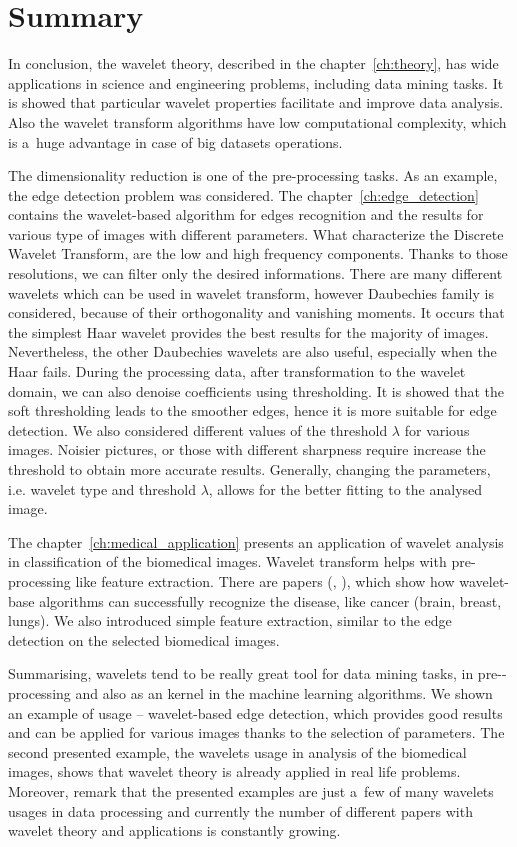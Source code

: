 \chapter*{Summary}

In conclusion, the wavelet theory, described in the chapter~\ref{ch:theory}, has wide applications in science and engineering problems, including data mining tasks. It is showed that particular wavelet properties facilitate and improve data analysis. Also the wavelet transform algorithms have low computational complexity, which is a~huge advantage in case of big datasets operations.

The dimensionality reduction is one of the pre-processing tasks. As an example, the edge detection problem was considered. The chapter~\ref{ch:edge_detection} contains the wavelet-based algorithm for edges recognition and the results for various type of images with different parameters. 
What characterize the Discrete Wavelet Transform, are the low and high frequency components. Thanks to those resolutions, we can filter only the desired informations. There are many different wavelets which can be used in wavelet transform, however Daubechies family is considered, because of their orthogonality and vanishing moments. It occurs that the simplest Haar wavelet provides the best results for the majority of images. Nevertheless, the other Daubechies wavelets are also useful, especially when the Haar fails. During the processing data, after transformation to the wavelet domain, we can also denoise coefficients using thresholding. It is showed that the soft thresholding leads to the smoother edges, hence it is more suitable for edge detection. We also considered different values of the threshold $\lambda$ for various images. Noisier pictures, or those with different sharpness require increase the threshold to obtain more accurate results.
Generally, changing the parameters, i.e. wavelet type and threshold $\lambda$, allows for the better fitting to the analysed image.

The chapter~\ref{ch:medical_application} presents an application of wavelet analysis in classification of the biomedical images. Wavelet transform helps with pre-processing like feature extraction. There are papers (\cite{MRI}, \cite{BiomedicalImages}), which show how wavelet-base algorithms can successfully recognize the disease, like cancer (brain, breast, lungs). We also introduced simple feature extraction, similar to the edge detection on the selected biomedical images.

Summarising, wavelets tend to be really great tool for data mining tasks, in pre-\allowbreak-processing and also as an kernel in the machine learning algorithms. We shown an example of usage -- wavelet-based edge detection, which provides good results and can be applied for various images thanks to the selection of parameters.
The second presented example, the wavelets usage in analysis of the biomedical images, shows that wavelet theory is already applied in real life problems. Moreover, remark that the presented examples are just a~few of many wavelets usages in data processing and currently the number of different papers with wavelet theory and applications is constantly growing.